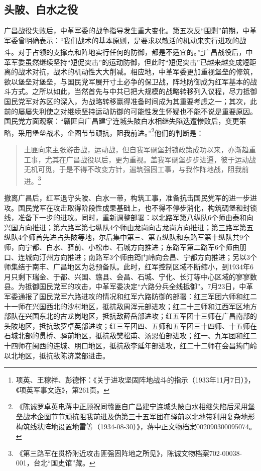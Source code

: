 \subsection{头陂、白水之役}


广昌战役失败后，中革军委的战争指导发生重大变化。第五次反“围剿”前期，中革军委曾明确表示：“我们战术的基本原则，是要求以敏活的机动来实行进攻的战斗。对于占领的支撑点和阵地实行任何的防御，都是不适宜的。”\footnote{项英、王稼祥、彭德怀：《关于进攻坚固阵地战斗的指示（1933年11月7日）》，《项英军事文选》，第261页。}广昌战役后，中革军委虽然继续坚持“短促突击”的运动防御，但此时“短促突击”已越来越变成短距离的战术对抗，战术的机动性大大削减。相应地，中革军委更加重视堡垒的修筑，欲以堡垒对堡垒，与国民党军展开寸土必争的保卫战，阵地防御成为红军基本的战斗方式。之所以如此，当然首先与中共已把大规模的战略转移列入议程，尽力抵御国民党军对苏区的深入，为战略转移赢得准备时间成为其重要考虑之一；其次，此前的屡屡失利使之对继续坚持运动防御的可能性发生怀疑也不能不说是重要原因。国民党方面观察：“赣匪自广昌建宁连城头陂白水相继失陷迭遭惨败后，变更策略，采用堡垒战术，企图节节顽抗，阻我前进。”\footnote{《陈诚罗卓英电蒋中正顾祝同赣匪自广昌建宁连城头陂白水相继失陷后采用堡垒战术企图节节顽抗阻我前进及伪第三十五军团在驿前以北地带利用复杂地形构筑线状阵地设置地雷等（1934-08-30）》，蒋中正文物档案002090300095074。}他们的判断是：

\begin{quote}

土匪向来主张游击战，运动战，但自我军碉堡封锁政策成功以来，亦渐趋重工事，尤其在广昌战役以后，更为重视。盖我军碉堡步步进逼，彼于运动战无机可觅，于是不得不改变方针，遍筑强固工事，与我作阵地战，阻我前进。\footnote{《第三路军在贯桥附近攻击匪强固阵地之所见》，陈诚文物档案702-00038-001，台北“国史馆”藏。}
\end{quote}


撤离广昌后，红军退守头陂、白水一带，构筑工事，准备抗击国民党军的进一步进攻。国民党军在攻击取得阶段性成果基础上，也不得不停步消化，构筑碉堡和封锁线，准备下一步的进攻。同时，重新调整部署：以北路军第八纵队6个师由泰和向兴国方向推进；第六路军第七纵队4个师由龙岗向古龙岗方向推进；第三路军第五纵队4个师首先进占头陂等地，尔后集中第三、第五纵队和东路军第十纵队共9个师，向宁都、白水、驿前、小松市、石城方向推进；东路军第二路军6个师由朋口、连城向汀州方向推进；南路军3个师由筠门岭向会昌、宁都方向推进；另以3个师集结于南丰、广昌地区为总预备队。此时，红军控制区域不断缩小，到1934年6月只剩下瑞金、于都、兴国、赣县、会昌、石城、宁化、长汀等中心区域的寥寥数县。为抵御国民党军的攻击，中革军委决定“六路分兵全线抵御”。7月23日，中革军委通报了国民党军六路进攻的情况和红军六路防御的部署：红三军团六师和红二十一师在兴国西北的沙村地区，抵抗敌周浑元部进攻；红二十三师和江西军区地方部队在兴国东北的古龙岗地区，抵抗敌薛岳部进攻；红五军团十三师在广昌南部的头陂地区，抵抗敌罗卓英部进攻；红三军团四、五师和五军团三十四师、十五师在石城北部的贯桥、驿前地区，抵抗敌樊松甫、汤恩伯部进攻；红一、九军团和红二十四师在闽西的连城、朋口地区，抵抗敌李延年部进攻，红二十二师在会昌筠门岭以北地区，抵抗敌陈济棠部进击。


